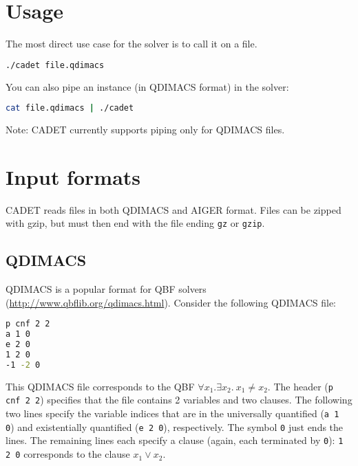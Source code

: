 \documentclass{article}
\begin{document}
\section{Usage}

The most direct use case for the solver is to call it on a file. 

\begin{lstlisting}[language = bash,
				   basicstyle=\footnotesize\ttfamily,
                   xleftmargin = 1cm,
                   framexleftmargin = 1em]
./cadet file.qdimacs
\end{lstlisting}

\noindent
You can also pipe an instance (in QDIMACS format) in the solver:
\begin{lstlisting}[language = bash,
				   basicstyle=\footnotesize\ttfamily,
                   xleftmargin = 1cm,
                   framexleftmargin = 1em]
cat file.qdimacs | ./cadet
\end{lstlisting}

\vspace{10pt}
Note: CADET currently supports piping only for QDIMACS files.

\section{Input formats}

CADET reads files in both QDIMACS and AIGER format.
Files can be zipped with gzip, but must then end with the file ending \texttt{gz} or \texttt{gzip}.

\subsection{QDIMACS}

QDIMACS is a popular format for QBF solvers (\url{http://www.qbflib.org/qdimacs.html}). 
Consider the following QDIMACS file:
\begin{lstlisting}[language = bash,
				   basicstyle=\footnotesize\ttfamily,
                   xleftmargin = 1cm,
                   framexleftmargin = 1em]
p cnf 2 2
a 1 0
e 2 0
1 2 0
-1 -2 0
\end{lstlisting}
This QDIMACS file corresponds to the QBF $\forall x_1.\exists x_2.~ x_1\neq x_2$. 
The header (\texttt{p cnf 2 2}) specifies that the file contains 2 variables and two clauses.
The following two lines specify the variable indices that are in the universally quantified (\texttt{a 1 0}) and existentially quantified (\texttt{e 2 0}), respectively. 
The symbol \texttt{0} just ends the lines. 	
The remaining lines each specify a clause (again, each terminated by \texttt{0}): \texttt{1 2 0} corresponds to the clause $x_1\vee x_2$. 
\end{document}

